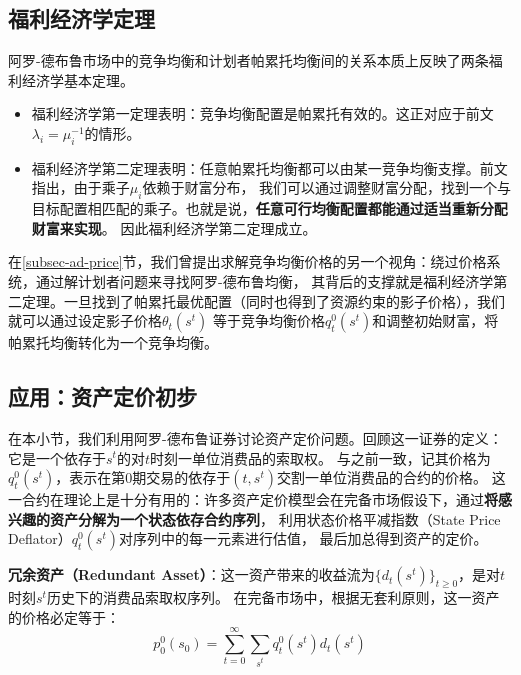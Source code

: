 \subsection{福利经济学定理}

阿罗-德布鲁市场中的竞争均衡和计划者帕累托均衡间的关系本质上反映了两条福利经济学基本定理。
\begin{itemize}
    \item 福利经济学第一定理表明：竞争均衡配置是帕累托有效的。这正对应于前文$\lambda_i=\mu_i^{-1}$的情形。
    \item 福利经济学第二定理表明：任意帕累托均衡都可以由某一竞争均衡支撑。前文指出，由于乘子$\mu_i$依赖于财富分布，
        我们可以通过调整财富分配，找到一个与目标配置相匹配的乘子。也就是说，\textbf{任意可行均衡配置都能通过适当重新分配财富来实现}。
        因此福利经济学第二定理成立。
\end{itemize}

在\ref{subsec-ad-price}节，我们曾提出求解竞争均衡价格的另一个视角：绕过价格系统，通过解计划者问题来寻找阿罗-德布鲁均衡，
其背后的支撑就是福利经济学第二定理。一旦找到了帕累托最优配置（同时也得到了资源约束的影子价格），我们就可以通过设定影子价格$\theta_t\left(s^t\right)$
等于竞争均衡价格$q_t^0\left(s^t\right)$和调整初始财富，将帕累托均衡转化为一个竞争均衡。


\subsection{应用：资产定价初步}

在本小节，我们利用阿罗-德布鲁证券讨论资产定价问题。回顾这一证券的定义：它是一个依存于$s^t$的对$t$时刻一单位消费品的索取权。
与之前一致，记其价格为$q_t^0\left(s^t\right)$，表示在第$0$期交易的依存于$(t,s^t)$交割一单位消费品的合约的价格。
这一合约在理论上是十分有用的：许多资产定价模型会在完备市场假设下，通过\textbf{将感兴趣的资产分解为一个状态依存合约序列}，
利用状态价格平减指数（State Price Deflator）$q_t^0\left(s^t\right)$对序列中的每一元素进行估值，
最后加总得到资产的定价。

\begin{example}
    \textbf{冗余资产（Redundant Asset）}：这一资产带来的收益流为$\{d_t\left(s^t\right)\}_{t\geq 0}$，是对$t$时刻$s^t$历史下的消费品索取权序列。
    在完备市场中，根据无套利原则，这一资产的价格必定等于：
    \begin{equation}    \label{eq-price-redundant}
        p_0^0\left(s_0\right)=\sum_{t=0}^{\infty} \sum_{s^t} q_t^0\left(s^t\right) d_t\left(s^t\right)
    \end{equation}
\end{example}

